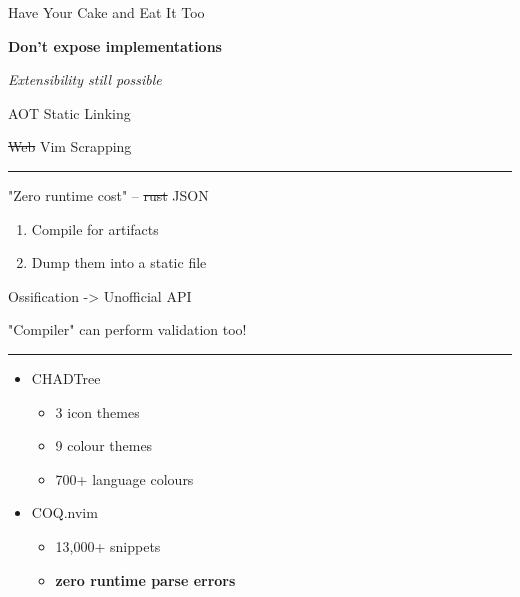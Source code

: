 \documentclass{beamer}
\begin{document}
\begin{frame}[standout]

	Have Your Cake and Eat It Too

	\textbf{Don't expose implementations}

	\textit{Extensibility still possible}
\end{frame}


\begin{frame}{AOT Static Linking}

	\st{Web} Vim Scrapping

	\rule{\textwidth}{0.1em}

	"Zero runtime cost" -- \st{rust} JSON

	\begin{enumerate}

		\item Compile  for artifacts

		\item Dump them into a static file

	\end{enumerate}

\end{frame}


\begin{frame}{Ossification -> Unofficial API}

	"Compiler" can perform validation too!

	\rule{\textwidth}{0.1em}

	\begin{itemize}

		\item CHADTree

		      \begin{itemize}

			      \item 3 icon themes

			      \item 9 colour themes

			      \item 700+ language colours

		      \end{itemize}

		\item COQ.nvim

		      \begin{itemize}

			      \item 13,000+ snippets

			      \item \textbf{zero runtime parse errors}

		      \end{itemize}

	\end{itemize}

\end{frame}
\end{document}
